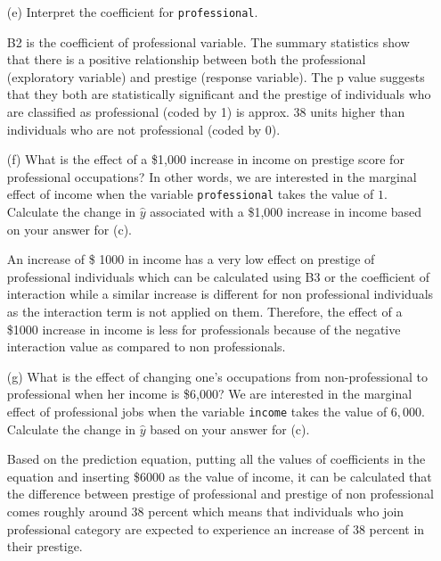 \documentclass[12pt,letterpaper]{article}
\begin{document}
\begin{enumerate}
	\vspace{1cm}
	\item [(e)]
	Interpret the coefficient for \texttt{professional}.
	
	\item[] B2 is the coefficient of professional variable. The summary statistics show that there is a positive relationship between both the professional (exploratory variable) and prestige (response variable). The p value suggests that they both are statistically significant and the prestige of individuals who are classified as professional (coded by 1) is approx. 38 units higher than individuals who are not professional (coded by 0).
	
	\vspace{1cm}
	\item [(f)]
	What is the effect of a \$1,000 increase in income on prestige score for professional occupations? In other words, we are interested in the marginal effect of income when the variable \texttt{professional} takes the value of $1$. Calculate the change in $\hat{y}$ associated with a \$1,000 increase in income based on your answer for (c).
	\item[]An increase of  \$ 1000 in income has a very low effect on prestige of professional individuals which can be calculated using B3 or the coefficient of interaction while a similar increase is different for non professional individuals as the
	interaction term is not applied on them. Therefore, the effect of a \$1000 
	increase in income is less for professionals because of the negative interaction
	value as compared to non professionals.
	
	
	
	\vspace{1cm}
	\item [(g)]
	What is the effect of changing one's occupations from non-professional to professional when her income is \$6,000? We are interested in the marginal effect of professional jobs when the variable \texttt{income} takes the value of $6,000$. Calculate the change in $\hat{y}$ based on your answer for (c).
	
	\item[] Based on the prediction equation, putting all the values of coefficients
	in the equation and inserting \$6000 as the value of income, it can be 
	calculated that the difference between prestige of professional and 
	prestige of non professional comes roughly around 38 percent which means that
	individuals who join professional category are expected to experience an
	increase of 38 percent in their prestige.
	
\end{enumerate}
\end{document}
